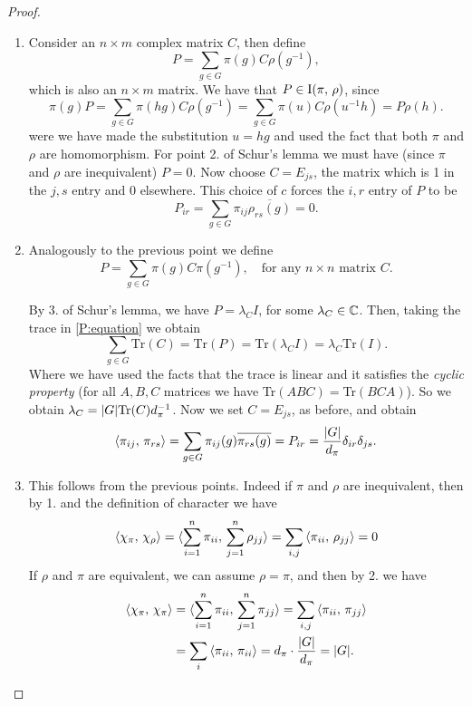 \begin{proof}~ 
\begin{enumerate}
\item Consider an $n\times m$ complex matrix $C$, then define
\begin{equation*}
P=\sum_{g\in G}\pi(g)C\rho(g^{-1}),
\end{equation*}
which is also an $n\times m$ matrix. We have that $P\in \operatorname{I}(\pi, \, \rho)$, since
\[
\pi(g)P=\sum_{g \in G}\pi(hg)C\rho(g^{-1})=\sum_{g\in G}\pi(u)C\rho(u^{-1}h)=P\rho(h).
\]
were we have made the substitution $u=hg$ and  used the fact that both $\pi$ and $\rho$ are homomorphism. For point 2. of Schur's lemma we must have (since $\pi$ and $\rho$ are inequivalent) $P=0$. Now choose $C=E_{js}$, the matrix which is 1 in the $j,s$ entry and 0 elsewhere. This choice of $c$ forces the $i,r$ entry of $P$ to be 
\[
P_{ir}=\sum_{g\in G}\pi_{ij}\overline{\rho_{rs}(g)}=0.
\]
\item Analogously to the previous point we define 
\begin{equation}
\label{P:equation}
P=\sum_{g\in G}\pi(g)C\pi(g^{-1}), \quad \text{for any $n\times n$ matrix $C$.}
\end{equation}

By 3. of Schur's lemma, we have $P=\lambda_CI$, for some $\lambda_C\in {\mathbb C}$. Then, taking the trace in \ref{P:equation} we obtain
\[
\text{$\sum_{g\in G}$Tr$(C)=$Tr$(P)=$Tr$(\lambda_CI)=\lambda_C$Tr$(I).$}
\]  
Where we have used the facts that the trace is linear and it satisfies the \emph{cyclic property} (for all $A,B,C$ matrices we have Tr$(ABC)=$Tr$(BCA)$). So we obtain $\lambda_C=\lvert G\rvert \text{Tr$(C)d_\pi^{-1}$}$. Now we set $C=E_{js}$, as before, and obtain 
\[
\braket{\pi_{ij},\, \pi_{rs}}=\sum_{g\in G}\pi_{ij}(g)\overline{\pi_{rs}(g)}=P_{ir}=\frac{\lvert G\rvert}{d_\pi}\delta_{ir}\delta_{js}.
\]
\item This follows from the previous points. Indeed if $\pi$ and $\rho$ are inequivalent, then by 1. and the definition of character we have
\[
\braket{\chi_\pi,\, \chi_\rho}=\braket{\sum_{i=1}^n\pi_{ii},\, \sum_{j=1}^n\rho_{jj} }=\sum_{i,j}\braket{\pi_{ii},\, \rho_{jj} }=0
\]
If $\rho$ and $\pi$ are equivalent, we can assume $\rho=\pi$, and then by 2. we have
\[
\begin{split}
\braket{\chi_\pi,\, \chi_\pi}&=\braket{\sum_{i=1}^n\pi_{ii},\, \sum_{j=1}^n\pi_{jj} }=\sum_{i,j}\braket{\pi_{ii},\, \pi_{jj} }\\
&=\sum_{i}\braket{\pi_{ii},\, \pi_{ii} }=d_\pi\cdot\frac{\lvert G\rvert}{d_\pi}=\lvert G\rvert.
\end{split}
\]
\end{enumerate}
\end{proof}
